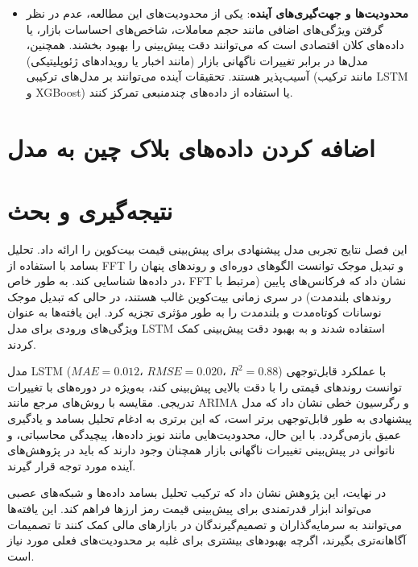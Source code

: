 \begin{itemize}
	\item \textbf{محدودیت‌ها و جهت‌گیری‌های آینده}: یکی از محدودیت‌های این مطالعه، عدم در نظر گرفتن ویژگی‌های اضافی مانند حجم معاملات، شاخص‌های احساسات بازار، یا داده‌های کلان اقتصادی است که می‌توانند دقت پیش‌بینی را بهبود بخشند. همچنین، مدل‌ها در برابر تغییرات ناگهانی بازار (مانند اخبار یا رویدادهای ژئوپلیتیکی) آسیب‌پذیر هستند. تحقیقات آینده می‌توانند بر مدل‌های ترکیبی (مانند ترکیب LSTM و XGBoost) یا استفاده از داده‌های چندمنبعی تمرکز کنند.
\end{itemize}

\section{اضافه کردن داده‌های بلاک چین به مدل}


\section{نتیجه‌گیری و بحث}
\label{sec:results_conclusion}
این فصل نتایج تجربی مدل پیشنهادی برای پیش‌بینی قیمت بیت‌کوین را ارائه داد. تحلیل بسامد با استفاده از FFT و تبدیل موجک توانست الگوهای دوره‌ای و روندهای پنهان را در داده‌ها شناسایی کند. به طور خاص، FFT نشان داد که فرکانس‌های پایین (مرتبط با روندهای بلندمدت) در سری زمانی بیت‌کوین غالب هستند، در حالی که تبدیل موجک نوسانات کوتاه‌مدت و بلندمدت را به طور مؤثری تجزیه کرد. این یافته‌ها به عنوان ویژگی‌های ورودی برای مدل LSTM استفاده شدند و به بهبود دقت پیش‌بینی کمک کردند.

مدل LSTM با عملکرد قابل‌توجهی ($ MAE = 0.012،\,\, RMSE = 0.020،\,\, R^2 = 0.88 $)  توانست روندهای قیمتی را با دقت بالایی پیش‌بینی کند، به‌ویژه در دوره‌های با تغییرات تدریجی. مقایسه با روش‌های مرجع مانند ARIMA و رگرسیون خطی نشان داد که مدل پیشنهادی به طور قابل‌توجهی برتر است، که این برتری به ادغام تحلیل بسامد و یادگیری عمیق بازمی‌گردد. با این حال، محدودیت‌هایی مانند نویز داده‌ها، پیچیدگی محاسباتی، و ناتوانی در پیش‌بینی تغییرات ناگهانی بازار همچنان وجود دارند که باید در پژوهش‌های آینده مورد توجه قرار گیرند.

در نهایت، این پژوهش نشان داد که ترکیب تحلیل بسامد داده‌ها و شبکه‌های عصبی می‌تواند ابزار قدرتمندی برای پیش‌بینی قیمت رمز ارزها فراهم کند. این یافته‌ها می‌توانند به سرمایه‌گذاران و تصمیم‌گیرندگان در بازارهای مالی کمک کنند تا تصمیمات آگاهانه‌تری بگیرند، اگرچه بهبودهای بیشتری برای غلبه بر محدودیت‌های فعلی مورد نیاز است.
